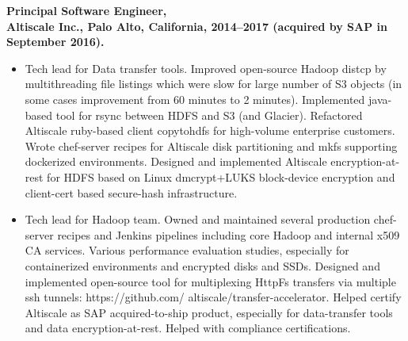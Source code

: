 \documentclass[10pt]{article}
\begin{document}
{\bf Principal Software Engineer,\\
Altiscale Inc., Palo Alto, California, 2014--2017 (acquired by SAP in September 2016).}
\begin{itemize}
\vspace{-5pt}
\item
Tech lead for Data transfer tools. Improved open-source Hadoop distcp by multithreading file listings which were 
slow for large number of S3 objects (in some cases improvement from 60 minutes to 2 minutes). Implemented java-based
tool for rsync between HDFS and S3 (and Glacier). Refactored Altiscale ruby-based client copytohdfs for high-volume 
enterprise customers.
Wrote chef-server recipes for Altiscale disk partitioning and mkfs supporting dockerized environments.
Designed and implemented Altiscale encryption-at-rest for HDFS based on 
Linux dmcrypt+LUKS block-device encryption and client-cert based secure-hash infrastructure. 
\item
Tech lead for Hadoop team. 
Owned and maintained several production chef-server recipes and Jenkins pipelines 
including core Hadoop and internal x509 CA services. Various performance evaluation studies, especially for containerized environments and encrypted disks and SSDs.
Designed and implemented open-source tool for multiplexing HttpFs transfers via multiple ssh tunnels: https://github.com/ altiscale/transfer-accelerator. Helped certify Altiscale as SAP acquired-to-ship product, especially for data-transfer tools and data encryption-at-rest. Helped with compliance certifications.
\end{itemize}

\end{document}
